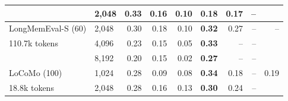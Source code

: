 \begin{tabular}{llrrrrrr|r}
 & 2,048 & \textbf{0.33} & 0.16 & 0.10 & 0.18 & 0.17 & -- &  \\
\midrule
LongMemEval-S (60) & 2,048 & 0.30 & 0.18 & 0.10 & \textbf{0.32} & 0.27 & -- & -- \\
\quad 110.7k tokens & 4,096 & 0.23 & 0.15 & 0.05 & \textbf{0.33} & -- & -- &  \\
 & 8,192 & 0.20 & 0.15 & 0.02 & \textbf{0.27} & -- & -- &  \\
\midrule
LoCoMo (100) & 1,024 & 0.28 & 0.09 & 0.08 & \textbf{0.34} & 0.18 & -- & 0.19 \\
\quad 18.8k tokens & 2,048 & 0.28 & 0.16 & 0.13 & \textbf{0.30} & 0.24 & -- &  \\
\bottomrule
\end{tabular}
